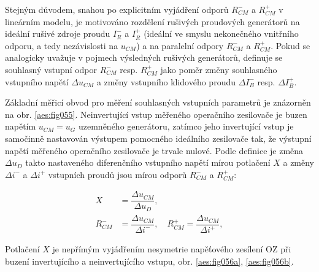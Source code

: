         Stejným důvodem, snahou po explicitním vyjádření odporů \(R_{CM}^-\) a \(R_{CM}^+\) v
        lineárním modelu, je motivováno rozdělení rušivých proudových generátorů na ideální rušivé
        zdroje proudu \(I_R^-\) a \(I_R^+\) (ideální ve smyslu nekonečného vnitřního odporu, a tedy
        nezávislosti na \(u_{CM}\)) a na paralelní odpory \(R_{CM}^-\) a \(R_{CM}^+\). Pokud se
        analogicky uvažuje v pojmech výsledných rušivých generátorů, definuje se souhlasný vstupní
        odpor \(R_{CM}^-\) resp. \(R_{CM}^+\) jako poměr změny souhlasného vstupního napětí \(\Delta
        u_{CM}\) a změny vstupního klidového proudu \(\Delta  I_B^-\) resp. \(\Delta I_B^+\).

        Základní měřicí obvod pro měření souhlasných vstupních parametrů je znázorněn na obr.
        \ref{aes:fig055}. Neinvertující vstup měřeného operačního zesilovače je buzen napětím
        \(u_{CM} = u_G\) uzemněného generátoru, zatímco jeho invertující vstup je samočinně
        nastavován výstupem pomocného ideálního zesilovače tak, že výstupní napětí měřeného
        operačního zesilovače je trvale nulové. Podle definice je změna \(\Delta u_D\) takto
        nastaveného diferenčního vstupního napětí mírou potlačení \(X\) a změny \(\Delta i^-\) a
        \(\Delta i^+\) vstupních proudů jsou mírou odporů \(R_{CM}^-\) a \(R_{CM}^+\):

        \begin{subequations}\label{aes:eq037}
          \begin{align}
                  X  &= \dfrac{\Delta u_{CM}}{\Delta u_D},          \label{aes:eq037a}  \\ 
            R_{CM}^- &=  \dfrac{\Delta u_{CM}}{\Delta i^-}, \quad  
            R_{CM}^+  =  \dfrac{\Delta u_{CM}}{\Delta i^+},         \label{aes:eq037b} 
          \end{align}
        \end{subequations}

        Potlačení \(X\) je nepřímým vyjádřením nesymetrie napěťového zesílení OZ při buzení
        invertujícího a neinvertujícího vstupu, obr. \ref{aes:fig056a}, \ref{aes:fig056b}.

